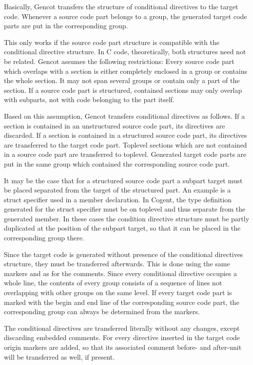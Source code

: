 Basically, Gencot transfers the structure of conditional directives to the target code. Whenever a source code
part belongs to a group, the generated target code parts are put in the corresponding group. 

This only works if the source code part structure is compatible with the conditional directive structure.
In C code, theoretically, both structures need not be related. Gencot assumes the following restrictions:
Every source code part which overlaps with a section is either completely enclosed in a group or
contains the whole section. It may not span several groups or contain only a part of the section. If a
source code part is structured, contained sections may only overlap with subparts, not with code belonging
to the part itself. 

Based on this assumption, Gencot transfers conditional directives as follows. If a section is contained in an 
unstructured source code part, its directives are discarded. If a section is contained in a structured source
code part, its directives are transferred to the target code part. Toplevel sections which are not contained in
a source code part are transferred to toplevel. Generated target code parts are put in the same group which
contained the corresponding source code part.

It may be the case that for a structured source code part a subpart target must be placed separated from the
target of the structured part. An example is a struct specifier used in a member declaration. In Cogent, the 
type definition generated for the struct specifier must be on toplevel and thus separate from the generated member.
In these cases the condition directive structure must be partly duplicated at the position of the subpart target,
so that it can be placed in the corresponding group there.

Since the target code is generated without presence of the conditional directives structure, they must be 
transferred afterwards. This is done using the same markers  and  as for the
comments. Since every conditional directive occupies a whole line, the contents of every group consists of
a sequence of lines not overlapping with other groups on the same level. If every target code part is marked 
with the begin and end line of the corresponding source code part, the corresponding group can always be
determined from the markers.

The conditional directives are transferred literally without any changes, except discarding embedded comments. 
For every directive inserted in the target code origin markers are added, so that its associated comment before-
and after-unit will be transferred as well, if present.

